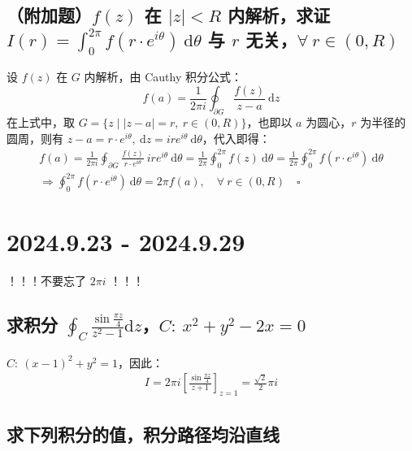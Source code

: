 \documentclass[UTF8]{report}
\theoremstyle{MyLineTheoremStyle} %
\theoremstyle{MyBlockTheoremStyle} %
\theoremstyle{MySubsubsectionStyle} %
\begin{document}
\section{（附加题）$f(z)$ 在 $| z | < R$ 内解析，求证 $\displaystyle I(r) = \int_{0}^{2\pi} f(r\cdot e^{i \theta}) \ \mathrm{d}\theta$ 与 $r$ 无关，$\forall\  r \in (0, R)$}

设 $f(z)$ 在 $G$ 内解析，由 Cauthy 积分公式：
\begin{equation*}
f(a) = \frac{1}{2\pi i} \oint_{\partial G} \frac{f(z)}{z - a}\ \mathrm{d}z
\end{equation*}
在上式中，取 $G = \{ z \mid |z - a| = r,\ r \in (0, R)\}$，也即以 $a$ 为圆心，$r$ 为半径的圆周，则有 $z - a = r\cdot e^{i \theta},\ \mathrm{d}z = ire^{i \theta}\ \mathrm{d}\theta $，代入即得：
\begin{gather*}
f(a) 
= \frac{1}{2\pi i} \oint_{\partial G} \frac{f(z)}{r\cdot e^{i \theta}}\ ire^{i \theta}\ \mathrm{d}\theta 
= \frac{1}{2 \pi} \oint_{0}^{2\pi}  f(z)\ \mathrm{d}\theta
= \frac{1}{2 \pi} \oint_{0}^{2\pi}  f(r\cdot e^{i \theta})\ \mathrm{d}\theta \\ 
\Longrightarrow  
\oint_{0}^{2\pi} f(r\cdot e^{i \theta})\ \mathrm{d}\theta = 2 \pi f(a),\quad \forall\ r \in (0, R)   \quad\square
\end{gather*}


\chapter{2024.9.23 - 2024.9.29}\thispagestyle{fancy}

{\color{red}\large ！！！不要忘了 $2 \pi i$ ！！！}

\section{求积分 $\displaystyle \oint_C \frac{\sin \frac{\pi z}{4}}{z^2 - 1} \mathrm{d} z$，$C:\ x^2 + y^2 -2x = 0$}

$C:\  (x - 1)^2 + y^2 =1$，因此：
\begin{gather}
I 
= 2 \pi i \left[ \frac{\sin \frac{\pi z}{4}}{z + 1} \right]_{z = 1} = \frac{\sqrt{2}}{2} \pi i
\end{gather}

\section{求下列积分的值，积分路径均沿直线}
\end{document}
